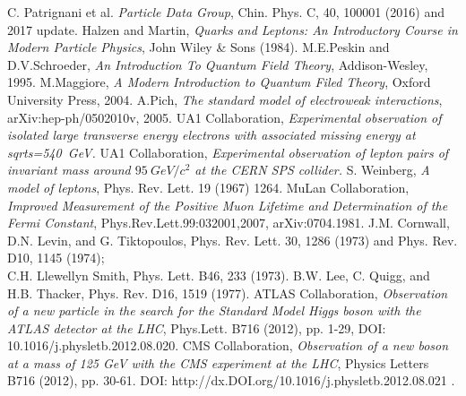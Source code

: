 \begin{thebibliography}{999}

		 C. Patrignani et al. \emph{Particle Data Group}, Chin. Phys. C, 40, 100001 (2016) and 2017 update.
		 Halzen and Martin, \emph{Quarks and Leptons: An Introductory Course in Modern Particle Physics}, John Wiley \& Sons (1984).
		 M.E.Peskin and D.V.Schroeder, \emph{An Introduction To Quantum Field Theory}, Addison-Wesley, 1995.
		 M.Maggiore, \emph{A Modern Introduction to Quantum Filed Theory}, Oxford University Press, 2004.
		 A.Pich, \emph{The standard model of electroweak interactions}, arXiv:hep-ph/0502010v,  2005.
		  UA1 Collaboration, \emph{Experimental observation of isolated large transverse energy electrons with associated missing energy at sqrt{s}=540~GeV.}
		 UA1 Collaboration, \emph{Experimental observation of lepton pairs of invariant mass around $95~GeV/c^{2}$ at the CERN SPS collider.}
		 S. Weinberg, \emph{A model of leptons}, Phys. Rev. Lett. 19 (1967) 1264.
		 MuLan Collaboration, \emph{Improved Measurement of the Positive Muon Lifetime and Determination of the Fermi Constant}, Phys.Rev.Lett.99:032001,2007, 	arXiv:0704.1981.
		 J.M. Cornwall, D.N. Levin, and G. Tiktopoulos, Phys. Rev. Lett. 30, 1286 (1973) and Phys. Rev. D10, 1145 (1974); \\
		C.H. Llewellyn Smith, Phys. Lett. B46, 233 (1973).
		 B.W. Lee, C. Quigg, and H.B. Thacker, Phys. Rev. D16, 1519 (1977).
		 ATLAS Collaboration, \emph{Observation of a new particle in the search for the Standard Model Higgs boson with the ATLAS detector at the LHC},  Phys.Lett. B716 (2012), pp. 1-29, DOI: 	10.1016/j.physletb.2012.08.020.
		 CMS Collaboration, \emph{Observation of a new boson at a mass of 125 GeV with the CMS experiment at the LHC}, Physics Letters B716 (2012), pp. 30-61. DOI:   http://dx.DOI.org/10.1016/j.physletb.2012.08.021 .

\end{thebibliography}
